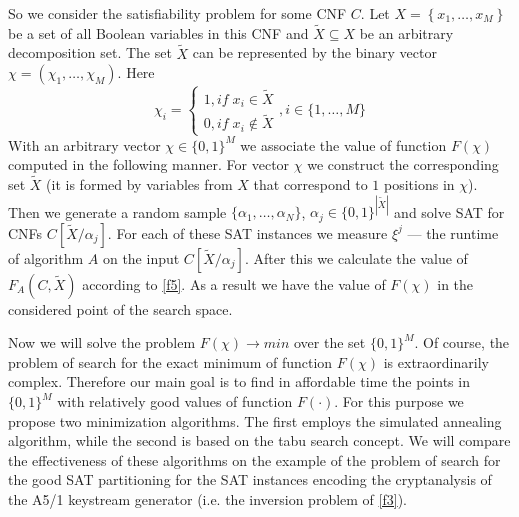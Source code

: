 \documentclass[runningheads,a4paper]{llncs}
\begin{document}
So we consider the satisfiability problem for some CNF $C$. Let $X=\left\{x_1,\ldots,x_M\right\}$ be a set of all Boolean variables in this CNF and $\tilde{X}\subseteq X$ be an arbitrary decomposition set. The set $\tilde{X}$ can be represented by the binary vector $\chi=\left(\chi_1,\ldots,\chi_M\right)$. Here 
\begin{equation*}
\chi_i=\left\{
\begin{array}{l}
1, if\;x_i\in\tilde{X}\\
0, if\;x_i\notin\tilde{X}
\end{array}
\right.
,i\in\{1,\ldots,M\}
\end{equation*}
With an arbitrary vector $\chi\in\{0,1\}^M$ we associate the value of function $F(\chi)$ computed in the following manner. For vector $\chi$ we construct the corresponding set $\tilde{X}$ (it is formed by variables from $X$ that correspond to $1$ positions in $\chi$). Then we generate a random sample $\{\alpha_1,\ldots,\alpha_N\}$, $\alpha_j\in\{0,1\}^{|\tilde{X}|}$ and solve SAT for CNFs $C\left[\tilde{X}/\alpha_j\right]$. For each of these SAT instances we measure $\xi^j$ --- the runtime of algorithm $A$ on the input $C\left[\tilde{X}/\alpha_j\right]$. After this we calculate the value of $F_A\left(C,\tilde{X}\right)$ according to \eqref{f5}. As a result we have the value of $F(\chi)$ in the considered point of the search space.

Now we will solve the problem $F(\chi)\rightarrow min$ over the set $\{0,1\}^M$. Of course, the problem of search for the exact minimum of function $F(\chi)$ is extraordinarily complex. Therefore our main goal is to find in affordable time the points in $\{0,1\}^M$ with relatively good values of function $F(\cdot)$. For this purpose we propose two minimization algorithms. The first employs the simulated annealing algorithm, while the second is based on the tabu search concept. We will compare the effectiveness of these algorithms on the example of the problem of search for the good SAT partitioning for the SAT instances encoding the cryptanalysis of the A5/1 keystream generator (i.e. the inversion problem of \eqref{f3}). 
\end{document}
